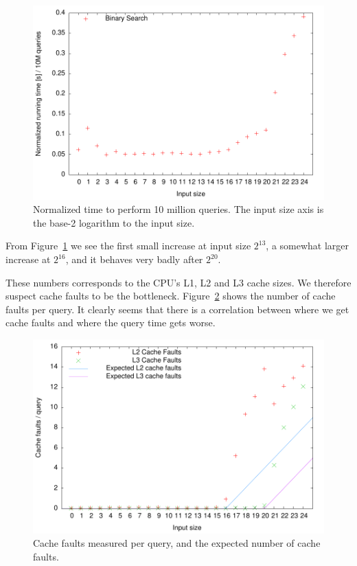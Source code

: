 \begin{figure}[h!]
  \label{fig:bs_runningtime}
  \centering
  \includegraphics{../week1/plots/outputs/bs_runningtime}
  \caption{Normalized time to perform 10 million queries. The input
    size axis is the base-2 logarithm to the input size.}
\end{figure}

From Figure~\ref{fig:bs_runningtime} we see the first small increase
at input size \(2^{13}\), a somewhat larger increase at \(2^{16}\),
and it behaves very badly after \(2^{20}\).

These numbers corresponds to the CPU's L1, L2 and L3 cache sizes. We
therefore suspect cache faults to be the
bottleneck. Figure~\ref{fig:bs_cachefaults} shows the number of cache
faults per query. It clearly seems that there is a correlation between
where we get cache faults and where the query time gets worse.

\begin{figure}[h!]
  \label{fig:bs_cachefaults}
  \centering
  \includegraphics{../week1/plots/outputs/bs_cachefaults}
  \caption{Cache faults measured per query, and the expected number of cache faults.}
\end{figure}

